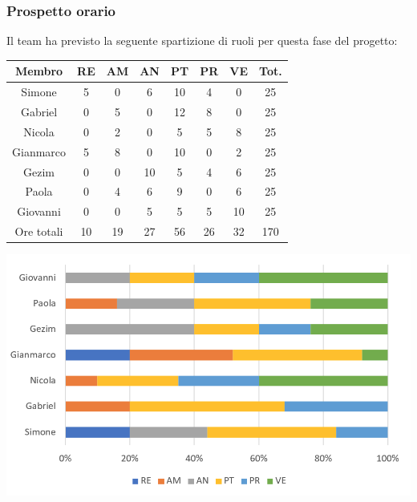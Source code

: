 \subsubsection{Prospetto orario}
Il team ha previsto la seguente spartizione di ruoli per questa fase del progetto:
\\
\begin{center}
\begin{tabular}{ |c|c|c|c|c|c|c|c|  }
 \hline
 Membro 		& RE 	& AM 	& AN 	& PT 	& PR 	& VE 	& Tot.\\
 \hline\hline
 Simone			& 5 		& 0		& 6 	& 10 	& 4 		& 0 		& 25\\
 Gabriel		& 0 		& 5 		& 0 	& 12		& 8 		& 0 		& 25\\
 Nicola			& 0 		& 2 		& 0 	& 5 		& 5 		& 8 		& 25\\
 Gianmarco		& 5 		& 8 		& 0 	& 10 	& 0 		& 2 		& 25\\
 Gezim			& 0 		& 0 		& 10 	& 5 		& 4 		& 6	 	& 25\\
 Paola			& 0 		& 4 		& 6 	& 9 		& 0 		& 6 		& 25\\
 Giovanni		& 0 		& 0	 	& 5 	& 5 		& 5 		& 10  	& 25\\
 \hline\hline
 Ore totali		& 10		& 19		& 27 	& 56	 	& 26 	& 32 	& 170\\
  \hline
\end{tabular}
\end{center}
\includegraphics[width=\textwidth]{res/img/hi33}
